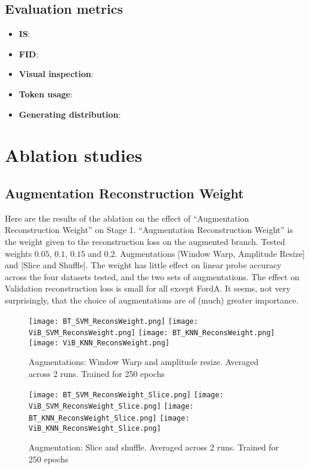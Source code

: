 \documentclass[../../thesis.tex]{subfiles}
\begin{document}
\subsection{Evaluation metrics}
\begin{itemize}
    \item \textbf{IS}:
    \item \textbf{FID}:
    \item \textbf{Visual inspection}:
    \item \textbf{Token usage}:
    \item \textbf{Generating distribution}:
\end{itemize}


\section{Ablation studies}

\subsection{Augmentation Reconstruction Weight}
Here are the results of the ablation on the effect of “Augmentation Reconstruction Weight” on Stage 1.
“Augmentation Reconstruction Weight” is the weight given to the reconstruction loss on the augmented branch.
Tested weights $0.05$, $0.1$, $0.15$ and $0.2$.
Augmentations [Window Warp, Amplitude Resize] and [Slice and Shuffle].
The weight has little effect on linear probe accuracy across the four datasets tested, and the two sets of augmentations.
The effect on Validation reconstruction loss is small for all except FordA.
It seems, not very surprisingly, that the choice of augmentations are of (much) greater importance.
\begin{figure}[h]
    \texttt{[image: BT\_SVM\_ReconsWeight.png]}
    \texttt{[image: ViB\_SVM\_ReconsWeight.png]}
    \texttt{[image: BT\_KNN\_ReconsWeight.png]}
    \texttt{[image: ViB\_KNN\_ReconsWeight.png]}
    \centering  
    \caption{Augmentations: Window Warp and amplitude resize. Averaged across 2 runs. Trained for 250 epochs}  
\end{figure}

\begin{figure}[h]
    \texttt{[image: BT\_SVM\_ReconsWeight\_Slice.png]}
    \texttt{[image: ViB\_SVM\_ReconsWeight\_Slice.png]}
    \texttt{[image: BT\_KNN\_ReconsWeight\_Slice.png]}
    \texttt{[image: ViB\_KNN\_ReconsWeight\_Slice.png]}

    \caption{Augmentation: Slice and shuffle. Averaged across 2 runs. Trained for 250 epochs}  
\end{figure}
\end{document}
